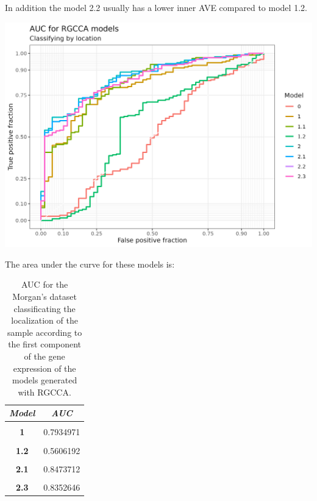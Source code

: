 \documentclass[
  12pt,
  a4paper,
  twoside,
  openright]{book}
\let\origfigure\figure
\let\endorigfigure\endfigure
\renewenvironment{figure}[1][2] {
    \expandafter\origfigure\expandafter[!htp]
} {
    \endorigfigure
}
\begin{document}
In addition the model 2.2 usually has a lower inner AVE compared to model 1.2.

\begin{figure}
\includegraphics[width=1\linewidth]{images/morgan-auc} \caption[AUC of RGCCA models in the Morgan's dataset]{AUC of RGCCA models in the Morgan's dataset. The classification of the localization of the sample according to the first component of the gene expression of the models generated with RGCCA on the Morgan's dataset.}\label{fig:morgan-auc-plot}
\end{figure}

The area under the curve for these models is:

\begin{table}[H]

\caption[AUC for the Morgan's dataset]{\label{tab:morgan-auc}AUC for the Morgan's dataset classificating the localization of the sample according to the first component of the gene expression of the models generated with RGCCA.}
\centering
\begin{tabular}[t]{|>{}c|>{}c|}
\hline
\em{\textbf{Model}} & \em{\textbf{AUC}}\\
\hline
\textbf{\cellcolor{gray!6}{0}} & \cellcolor{gray!6}{0.4969734}\\
\hline
\textbf{1} & 0.7934971\\
\hline
\textbf{\cellcolor{gray!6}{1.1}} & \cellcolor{gray!6}{0.8161536}\\
\hline
\textbf{1.2} & 0.5606192\\
\hline
\textbf{\cellcolor{gray!6}{2}} & \cellcolor{gray!6}{0.8546351}\\
\hline
\textbf{2.1} & 0.8473712\\
\hline
\textbf{\cellcolor{gray!6}{2.2}} & \cellcolor{gray!6}{0.8352646}\\
\hline
\textbf{2.3} & 0.8352646\\
\hline
\end{tabular}
\end{table}
\end{document}
